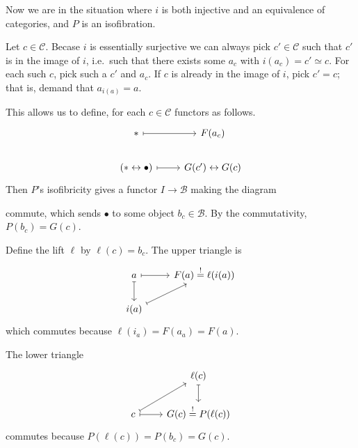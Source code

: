 \documentclass[main.tex]{subfiles}
\begin{document}
Now we are in the situation where $i$ is both injective and an equivalence of categories, and $P$ is an isofibration.

Let $c \in \mathcal{C}$. Becase $i$ is essentially surjective we can always pick $c' \in \mathcal{C}$ such that $c'$ is in the image of $i$, i.e.\ such that there exists some $a_{c}$ with $i(a_{c}) = c' \simeq c$. For each such $c$, pick such a $c'$ and $a_{c}$. If $c$ is already in the image of $i$, pick $c' = c$; that is, demand that $a_{i(a)} = a$.

This allows us to define, for each $c \in \mathcal{C}$ functors as follows.
\begin{equation*}
  \begin{tikzcd}
    *
    \arrow[r, mapsto]
    & F(a_{c})
    \\
    (* \leftrightarrow \bullet)
    \arrow[r, mapsto]
    & G(c') \leftrightarrow G(c)
  \end{tikzcd}
\end{equation*}
Then $P$'s isofibricity gives a functor $I \to \mathcal{B}$ making the diagram

commute, which sends $\bullet$ to some object $b_{c} \in \mathcal{B}$. By the commutativity, $P(b_{c}) = G(c)$.

Define the lift $\ell$ by $\ell(c) = b_{c}$. The upper triangle is
\begin{equation*}
  \begin{tikzcd}
    a
    \arrow[d, mapsto]
    \arrow[r, mapsto]
    & F(a) \overset{!}{=} \ell(i(a))
    \\
    i(a)
    \arrow[ur, mapsto]
  \end{tikzcd}
\end{equation*}
which commutes because $\ell(i_{a}) = F(a_{a}) = F(a)$.

The lower triangle
\begin{equation*}
  \begin{tikzcd}
    & \ell(c)
    \arrow[d, mapsto]
    \\
    c
    \arrow[r, mapsto]
    \arrow[ur, mapsto]
    & G(c) \overset{!}{=} P(\ell(c))
  \end{tikzcd}
\end{equation*}
commutes because $P(\ell(c)) = P(b_{c}) = G(c)$.
\end{document}
